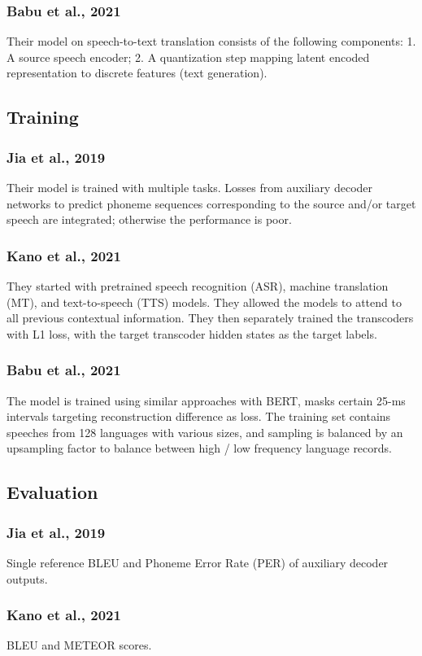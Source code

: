 \documentclass{article}
\begin{document}
\subsubsection{Babu et al., 2021}
Their model on speech-to-text translation  consists of the following components: 1. A source speech encoder; 2. A quantization step mapping latent encoded representation to discrete features (text generation).
\subsection{Training}
\subsubsection{Jia et al., 2019}
Their model is trained with multiple tasks. Losses from auxiliary decoder networks to predict phoneme sequences corresponding to the source and/or target speech are integrated; otherwise the performance is poor.
\subsubsection{Kano et al., 2021}
They started with pretrained speech recognition (ASR), machine translation (MT), and text-to-speech (TTS) models. They allowed the models to attend to all previous contextual information. They then separately trained the transcoders with L1 loss, with the target transcoder hidden states as the target labels.
\subsubsection{Babu et al., 2021}
The model is trained using similar approaches with BERT, masks certain 25-ms intervals targeting reconstruction difference as loss. The training set contains speeches from 128 languages with various sizes, and sampling is balanced by an upsampling factor to balance between high / low frequency language records.
\subsection{Evaluation}
\subsubsection{Jia et al., 2019}
Single reference BLEU and Phoneme Error Rate (PER) of auxiliary decoder outputs.
\subsubsection{Kano et al., 2021}
BLEU and METEOR scores.
\end{document}
